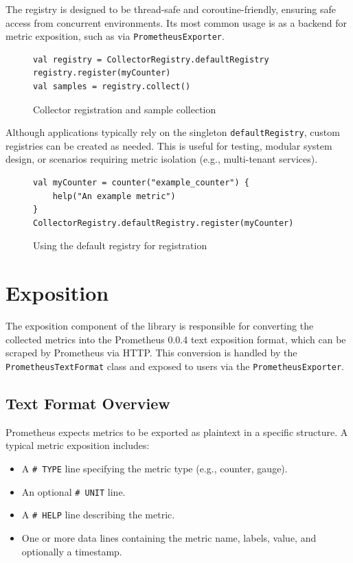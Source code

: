 The registry is designed to be thread-safe and coroutine-friendly, ensuring safe access from concurrent environments.
Its most common usage is as a backend for metric exposition, such as via \texttt{PrometheusExporter}.

\begin{figure}[h]
    \begin{lstlisting}
val registry = CollectorRegistry.defaultRegistry
registry.register(myCounter)
val samples = registry.collect()
    \end{lstlisting}
    \caption{Collector registration and sample collection}
\end{figure}

Although applications typically rely on the singleton \texttt{defaultRegistry}, custom registries can be created as needed. This is useful for testing, modular system design, or scenarios requiring metric isolation (e.g., multi-tenant services).

\begin{figure}[h]
    \begin{lstlisting}
val myCounter = counter("example_counter") {
    help("An example metric")
}
CollectorRegistry.defaultRegistry.register(myCounter)
    \end{lstlisting}
    \caption{Using the default registry for registration}
\end{figure}


\section{Exposition}\label{sec:exposition}

The exposition component of the library is responsible for converting the collected metrics into the Prometheus 0.0.4 text exposition format, which can be scraped by Prometheus via HTTP. This conversion is handled by the \texttt{PrometheusTextFormat} class and exposed to users via the \texttt{PrometheusExporter}.

\subsection{Text Format Overview}\label{subsec:text-format-overview}

Prometheus expects metrics to be exported as plaintext in a specific structure.
A typical metric exposition includes:

\begin{itemize}
    \item A \texttt{\# TYPE} line specifying the metric type (e.g., counter, gauge).
    \item An optional \texttt{\# UNIT} line.
    \item A \texttt{\# HELP} line describing the metric.
    \item One or more data lines containing the metric name, labels, value, and optionally a timestamp.
\end{itemize}

